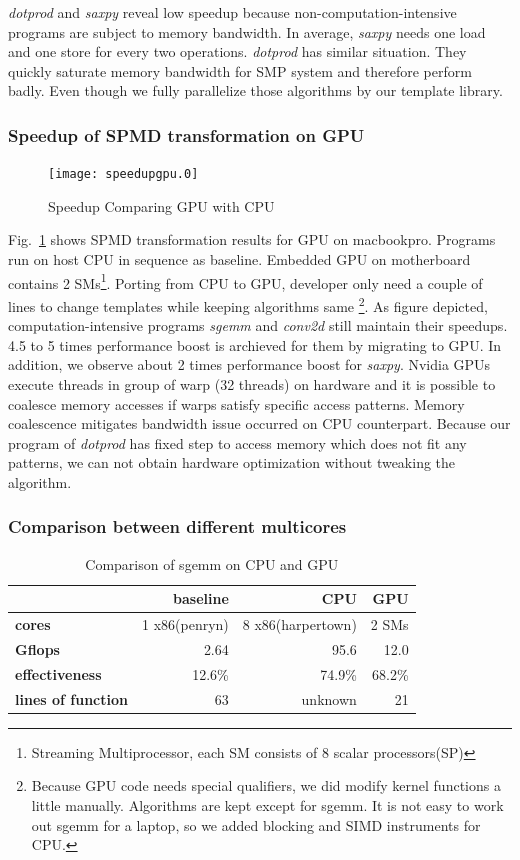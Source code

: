 \documentclass[10pt, conference, compsocconf]{IEEEtran}
\begin{document}
\textit{dotprod} and \textit{saxpy} reveal low speedup because non-computation-intensive
programs are subject to memory bandwidth.  In average, \textit{saxpy} needs one load and one 
store for every two operations. \textit{dotprod} has similar
situation. They quickly saturate memory bandwidth for SMP system and
therefore perform badly. Even though we fully parallelize those
algorithms by our template library. 
\subsubsection{Speedup of SPMD transformation on GPU}
\begin{figure}
\texttt{[image: speedupgpu.0]}
\caption{Speedup Comparing GPU with CPU}\label{fig:spdgpu}
\end{figure}

Fig.~\ref{fig:spdgpu} shows SPMD transformation results for GPU on
macbookpro. Programs run on host CPU  in sequence as
baseline. Embedded GPU on motherboard contains 2
SMs\footnote{Streaming Multiprocessor, each SM consists of 8 scalar processors(SP)}.
Porting from CPU to GPU, developer only need a couple of lines to change
templates while keeping algorithms same \footnote{
Because GPU code needs special qualifiers, we did modify kernel
functions a little manually.  Algorithms are kept except for sgemm. It is not easy
 to work out sgemm for a laptop, so we added blocking and SIMD
 instruments for CPU.}. As figure depicted,  computation-intensive programs
\textit{sgemm} and \textit{conv2d} still maintain their speedups. 4.5 to 5 times
performance boost is archieved for them by migrating to GPU.
In addition, we observe about 2 times performance boost for
\textit{saxpy}. Nvidia GPUs execute
threads in group of warp (32 threads) on hardware and it is
possible to coalesce memory accesses if warps satisfy
specific access patterns. Memory coalescence mitigates bandwidth issue
occurred on CPU counterpart. Because our program of \textit{dotprod} has fixed
step to access memory which does not fit any patterns, we can not
obtain hardware optimization without tweaking the algorithm.

\subsubsection{Comparison between different multicores}
\begin{table}[hbt]
\caption{Comparison of sgemm on CPU and GPU}\label{tbl:sgemm}
\begin{tabular}{|l|r|r|r|}
\hline
& baseline& CPU & GPU\\
\hline
\textbf{cores} &1 x86(penryn)& 8 x86(harpertown)& 2 SMs\\
\hline
\textbf{Gflops}& 2.64 &95.6&  12.0\\
\hline
\textbf{effectiveness}&12.6\%& 74.9\%&68.2\%\\
\hline
\textbf{lines of function}&63&unknown&21\\
\hline
\end{tabular}
\end{table}
\end{document}
